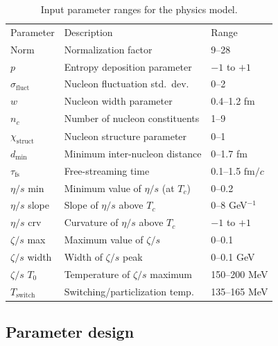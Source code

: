 \documentclass[aps,prc,reprint,amsmath,nofootinbib]{revtex4-1}
\newcommand{\fmc}{\ensuremath{\text{fm}/c}}
\newcommand{\sigmaf}{\sigma_\text{fluct}}
\newcommand{\X}{\chi_\text{struct}}
\newcommand{\taufs}{\tau_\text{fs}}
\newcommand{\dmin}{d_\text{min}}
\newcommand{\paddedhline}{\noalign{\smallskip}\hline\noalign{\smallskip}}
\begin{document}
\begin{table}[t]
  \caption{Input parameter ranges for the physics model.}
  \begin{ruledtabular}
  \begin{tabular}{lll}
    Parameter         & Description                        & Range             \\
    \paddedhline
    Norm              & Normalization factor                 & 9--28           \\
    $p$               & Entropy deposition parameter         & $-1$ to $+1$    \\
    $\sigmaf$         & Nucleon fluctuation std.\ dev.\      & 0--2            \\
    $w$               & Nucleon width parameter              & 0.4--1.2 fm     \\
    $n_c$             & Number of nucleon constituents       & 1--9            \\
    $\X$              & Nucleon structure parameter          & 0--1            \\
    $\dmin$           & Minimum inter-nucleon distance       & 0--1.7 fm       \\
    $\taufs$          & Free-streaming time                  & 0.1--1.5 \fmc   \\
    $\eta/s$ min      & Minimum value of $\eta/s$ (at $T_c$) & 0--0.2          \\
    $\eta/s$ slope    & Slope of $\eta/s$ above $T_c$        & 0--8 GeV$^{-1}$ \\
    $\eta/s$ crv      & Curvature of $\eta/s$ above $T_c$    & $-1$ to $+1$    \\
    $\zeta/s$ max     & Maximum value of $\zeta/s$           & 0--0.1          \\
    $\zeta/s$ width   & Width of $\zeta/s$ peak              & 0--0.1 GeV      \\
    $\zeta/s$ $T_0$   & Temperature of $\zeta/s$ maximum     & 150--200 MeV    \\
    $T_\text{switch}$ & Switching/particlization temp.       & 135--165 MeV    \\
  \end{tabular}
  \end{ruledtabular}
  \label{tab:design}
\end{table}

\subsection{Parameter design}
\end{document}
